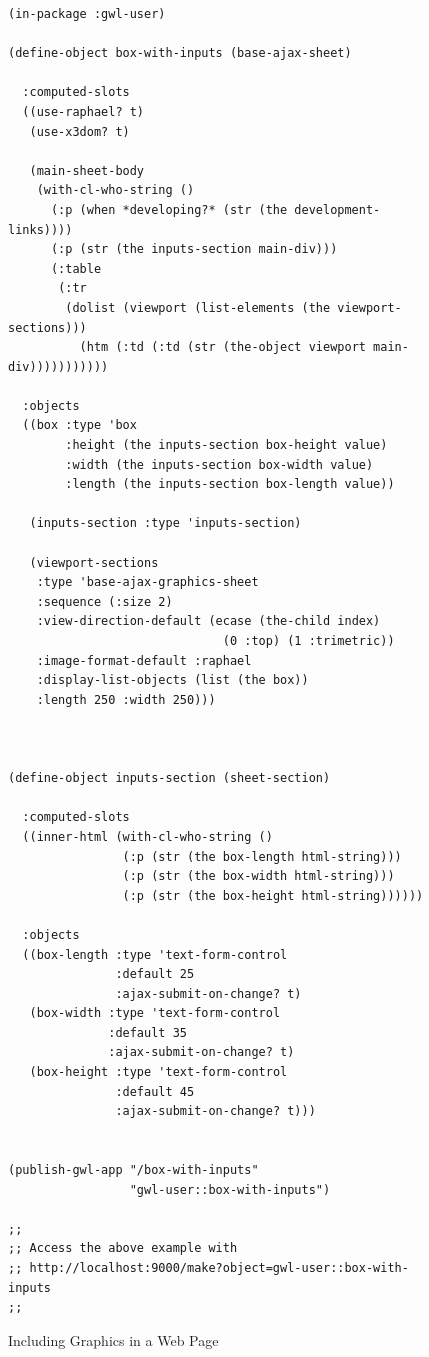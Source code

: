 \documentclass [11pt]{book}
\begin{document}
\begin{figure}
\begin{lrbox}{\boxedverb}
\begin{minipage}{\linewidth}
\tiny{

\begin{verbatim}(in-package :gwl-user)

(define-object box-with-inputs (base-ajax-sheet)
  
  :computed-slots
  ((use-raphael? t)
   (use-x3dom? t)
   
   (main-sheet-body 
    (with-cl-who-string ()
      (:p (when *developing?* (str (the development-links))))
      (:p (str (the inputs-section main-div)))
      (:table
       (:tr
        (dolist (viewport (list-elements (the viewport-sections)))
          (htm (:td (:td (str (the-object viewport main-div)))))))))))
  
  :objects
  ((box :type 'box
        :height (the inputs-section box-height value)
        :width (the inputs-section box-width value)
        :length (the inputs-section box-length value))
   
   (inputs-section :type 'inputs-section)

   (viewport-sections
    :type 'base-ajax-graphics-sheet
    :sequence (:size 2)
    :view-direction-default (ecase (the-child index)
                              (0 :top) (1 :trimetric))
    :image-format-default :raphael
    :display-list-objects (list (the box))
    :length 250 :width 250)))
  

 
(define-object inputs-section (sheet-section)
  
  :computed-slots
  ((inner-html (with-cl-who-string ()
                (:p (str (the box-length html-string)))
                (:p (str (the box-width html-string)))
                (:p (str (the box-height html-string))))))

  :objects 
  ((box-length :type 'text-form-control
               :default 25
               :ajax-submit-on-change? t)
   (box-width :type 'text-form-control
              :default 35
              :ajax-submit-on-change? t)
   (box-height :type 'text-form-control
               :default 45
               :ajax-submit-on-change? t)))


(publish-gwl-app "/box-with-inputs" 
                 "gwl-user::box-with-inputs")

;;
;; Access the above example with 
;; http://localhost:9000/make?object=gwl-user::box-with-inputs
;;

\end{verbatim}}
\end{minipage}
\end{lrbox}
\fbox{\usebox{\boxedverb}}

\caption{Including Graphics in a Web Page}

\label{fig:gwl-5}

\end{figure}
\end{document}
